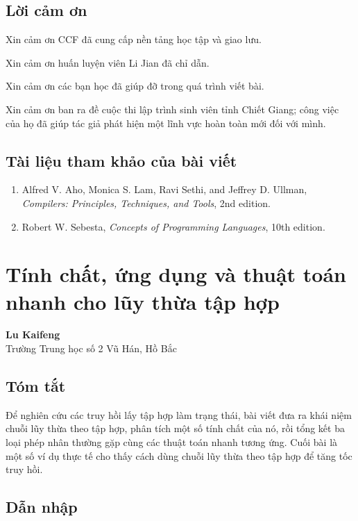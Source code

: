 \documentclass[11pt]{article}
\begin{document}
\subsection{Lời cảm ơn}

Xin cảm ơn CCF đã cung cấp nền tảng học tập và giao lưu.

Xin cảm ơn huấn luyện viên Li Jian đã chỉ dẫn.

Xin cảm ơn các bạn học đã giúp đỡ trong quá trình viết bài.

Xin cảm ơn ban ra đề cuộc thi lập trình sinh viên tỉnh Chiết Giang; công việc
của họ đã giúp tác giả phát hiện một lĩnh vực hoàn toàn mới đối với mình.

\subsection*{Tài liệu tham khảo của bài viết}

\begin{enumerate}
  \item Alfred V. Aho, Monica S. Lam, Ravi Sethi, and Jeffrey D. Ullman,
  \emph{Compilers: Principles, Techniques, and Tools}, 2nd edition.
  \item Robert W. Sebesta, \emph{Concepts of Programming Languages}, 10th
  edition.
\end{enumerate}

\section{Tính chất, ứng dụng và thuật toán nhanh cho lũy thừa tập hợp}

\begin{center}
\textbf{Lu Kaifeng}\\
Trường Trung học số 2 Vũ Hán, Hồ Bắc
\end{center}

\subsection*{Tóm tắt}

Để nghiên cứu các truy hồi lấy tập hợp làm trạng thái, bài viết đưa ra khái
niệm chuỗi lũy thừa theo tập hợp, phân tích một số tính chất của nó, rồi tổng
kết ba loại phép nhân thường gặp cùng các thuật toán nhanh tương ứng. Cuối bài
là một số ví dụ thực tế cho thấy cách dùng chuỗi lũy thừa theo tập hợp để tăng
tốc truy hồi.

\subsection{Dẫn nhập}
\end{document}
